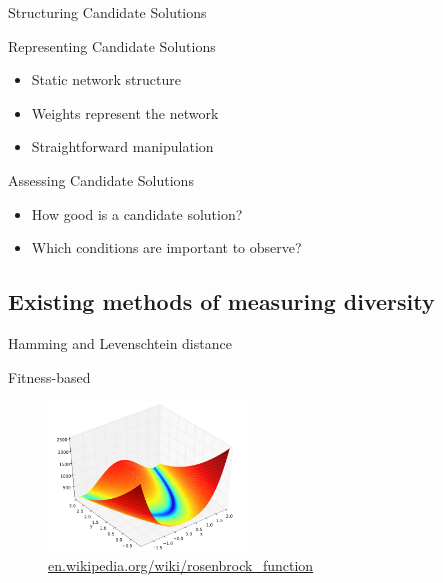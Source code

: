 \begin{frame}{Structuring Candidate Solutions}
  \begin{center}
    
  \end{center}
\end{frame}

\begin{frame}{Representing Candidate Solutions}
  \begin{itemize}
    \item Static network structure
    \item Weights represent the network
    \item Straightforward manipulation
  \end{itemize}
\end{frame}

\begin{frame}{Assessing Candidate Solutions}
  \begin{itemize}
    \item How good is a candidate solution?
    \item Which conditions are important to observe?
  \end{itemize}
\end{frame}

\subsection{Existing methods of measuring diversity}

\begin{frame}{Hamming and Levenschtein distance}
  
\end{frame}

\begin{frame}{Fitness-based}
  \begin{figure}
    \centering
    \includegraphics[height=150px]{elias/images/elevation.png}
    \caption{\url{en.wikipedia.org/wiki/rosenbrock_function}}
  \end{figure}
\end{frame}

